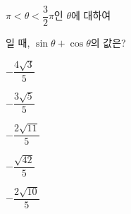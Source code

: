 $\pi<\theta<\dfrac{3}{2}\pi$인 $\theta$에 대하여 \par\smallskip{}\par\smallskip\noindent 일 때, $\sin\theta+\cos\theta$의 값은?
\begin{choices32}{\rule[-3ex]{0pt}{8ex}$-\dfrac{4\sqrt{3}}{5}$}{\rule[-3ex]{0pt}{8ex}$-\dfrac{3\sqrt{5}}{5}$}{\rule[-3ex]{0pt}{8ex}$-\dfrac{2\sqrt{11}}{5}$}{\rule[-3ex]{0pt}{8ex}$-\dfrac{\sqrt{42}}{5}$}{\rule[-3ex]{0pt}{8ex}$-\dfrac{2\sqrt{10}}{5}$}\end{choices32}
